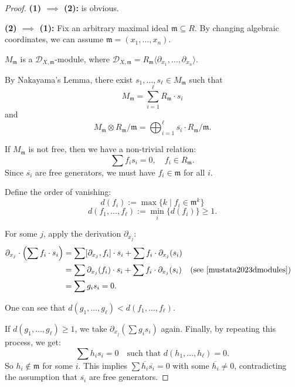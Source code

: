 \begin{proof}
    \textbf{(1) $\implies$ (2):} is obvious.

    \textbf{(2) $\implies$ (1):} Fix an arbitrary maximal ideal $\mathfrak{m} \subseteq R$.
    By changing algebraic coordinates, we can assume $\mathfrak{m} = (x_1, \dots, x_n)$.

    $M_{\mathfrak{m}}$ is a $\mathcal{D}_{X,\mathfrak{m}}$-module, where $\mathcal{D}_{X,\mathfrak{m}} = R_{\mathfrak{m}}\langle \partial_{x_1}, \dots, \partial_{x_n} \rangle$.

    By Nakayama's Lemma, there exist $s_1, \dots, s_{\ell} \in M_{\mathfrak{m}}$ such that
    \[
        M_{\mathfrak{m}} = \sum_{i=1}^{\ell} R_{\mathfrak{m}} \cdot s_i
    \]
    and
    \[
        M_{\mathfrak{m}} \otimes R_{\mathfrak{m}}/\mathfrak{m} = \bigoplus_{i=1}^{\ell} \overline{s_i} \cdot R_{\mathfrak{m}}/\mathfrak{m}.
    \]

    If $M_{\mathfrak{m}}$ is not free, then we have a non-trivial relation:
    \[
        \sum f_i s_i = 0, \quad f_i \in R_{\mathfrak{m}}.
    \]
    Since $\overline{s_i}$ are free generators, we must have $f_i \in \mathfrak{m}$ for all $i$.

    Define the order of vanishing:
    \[
        d(f_i) := \max \{ k \mid f_i \in \mathfrak{m}^k \}
    \]
    \[
        d(f_1, \dots, f_{\ell}) := \min_{i} \{ d(f_i) \} \ge 1.
    \]

    For some $j$, apply the derivation $\partial_{x_j}$:
    \begin{align*}
        \partial_{x_j} \cdot \left( \sum f_i \cdot s_i \right) & = \sum [\partial_{x_j}, f_i] \cdot s_i + \sum f_i \cdot \partial_{x_j}(s_i)                                                              \\
                                                               & = \sum \partial_{x_j}(f_i) \cdot s_i + \sum f_i \cdot \partial_{x_j}(s_i)   &  & \text{(see \cite[Prop~2.25(iii)]{mustata2023dmodules})} \\
                                                               & = \sum g_i s_i = 0.
    \end{align*}


    One can see that $d(g_1, \dots, g_{\ell}) < d(f_1, \dots, f_{\ell})$.

    If $d(g_1, \dots, g_{\ell}) \ge 1$, we take $\partial_{x_j}(\sum g_i s_i)$ again.
    Finally, by repeating this process, we get:
    \[
        \sum h_i s_i = 0 \quad \text{such that } d(h_1, \dots, h_{\ell}) = 0.
    \]
    So $h_i \notin \mathfrak{m}$ for some $i$.
    This implies $\sum \overline{h_i} \overline{s_i} = 0$ with some $\overline{h_i} \neq 0$, contradicting the assumption that $\overline{s_i}$ are free generators.


\end{proof}
